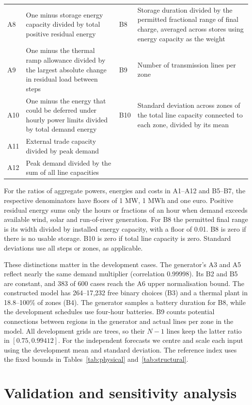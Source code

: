\documentclass[11pt,a4paper]{article}
\begin{document}
\begin{table}[!htb]
\begin{tabularx}{\linewidth}{@{}l L l L@{}}
A8 & One minus storage energy capacity divided by total positive residual energy & B8 & Storage duration divided by the permitted fractional range of final charge, averaged across stores using energy capacity as the weight\\
A9 & One minus the thermal ramp allowance divided by the largest absolute change in residual load between steps & B9 & Number of transmission lines per zone\\
A10 & One minus the energy that could be deferred under hourly power limits divided by total demand energy & B10 & Standard deviation across zones of the total line capacity connected to each zone, divided by its mean\\
A11 & External trade capacity divided by peak demand & & \\
A12 & Peak demand divided by the sum of all line capacities & & \\
\bottomrule\end{tabularx}
\end{table}

For the ratios of aggregate powers, energies and costs in A1--A12 and B5--B7, the respective denominators have floors of 1 MW, 1 MWh and one euro. Positive residual energy sums only the hours or fractions of an hour when demand exceeds available wind, solar and run-of-river generation. For B8 the permitted final range is its width divided by installed energy capacity, with a floor of 0.01. B8 is zero if there is no usable storage. B10 is zero if total line capacity is zero. Standard deviations use all steps or zones, as applicable.

These distinctions matter in the development cases. The generator's A3 and A5 reflect nearly the same demand multiplier (correlation 0.99998). Its B2 and B5 are constant, and 383 of 600 cases reach the A6 upper normalisation bound. The constructed model has 264--17,232 free binary choices (B3) and a thermal plant in 18.8--100\% of zones (B4). The generator samples a battery duration for B8, while the development schedules use four-hour batteries. B9 counts potential connections between regions in the generator and actual lines per zone in the model. All development grids are trees, so their \(N-1\) lines keep the latter ratio in \([0.75,0.99412]\). For the independent forecasts we centre and scale each input using the development mean and standard deviation. The reference index uses the fixed bounds in Tables~\ref{tab:physical} and~\ref{tab:structural}.

\section{Validation and sensitivity analysis}
\label{app:validation}
\end{document}
